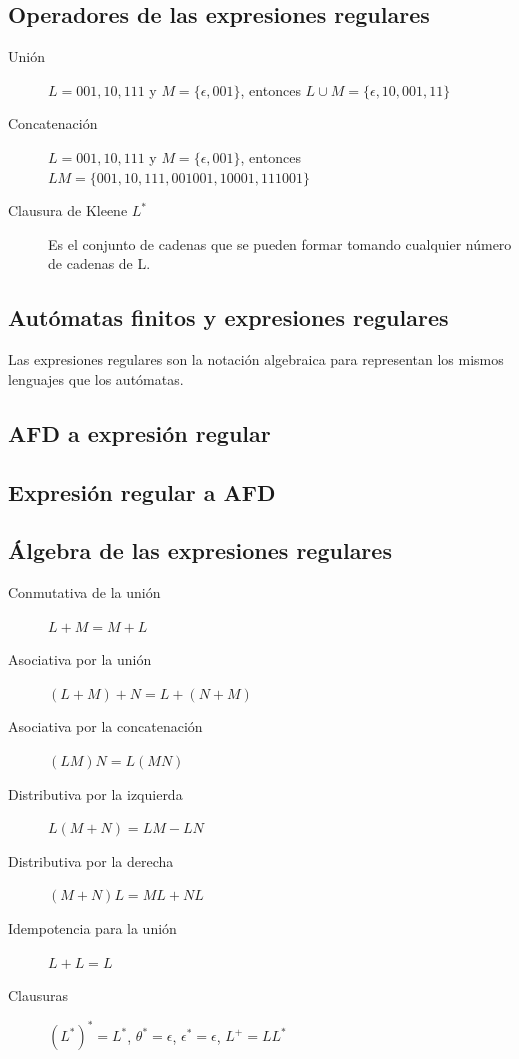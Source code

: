 \documentclass[a4paper,9pt]{extarticle}
\begin{document}
\begin{multicols*}{2}
\subsection{Operadores de las expresiones regulares}
\begin{description}
\item[Unión] $L = {001, 10, 111}$ y $M = \{\epsilon, 001\}$, entonces $L  \cup M=\{\epsilon, 10, 001, 11\}$
\item[Concatenación] $L = {001, 10, 111}$ y $M = \{\epsilon, 001\}$, entonces $LM=\{001, 10, 111, 001001, 10001, 111001 \}$
\item[Clausura de Kleene $L^*$] Es el conjunto de cadenas que se pueden formar tomando cualquier número de cadenas de L.
\end{description}

\subsection{Autómatas finitos y expresiones regulares}
Las expresiones regulares son la notación algebraica  para representan los mismos lenguajes que los autómatas.

\subsection{AFD a expresión regular}

\subsection{Expresión regular a AFD}

\subsection{Álgebra de las expresiones regulares}
\begin{description}
\item[Conmutativa de la unión] $L+M=M+L$
\item[Asociativa por la unión] $(L+M)+N = L + (N +M)$
\item[Asociativa por la concatenación] $(LM)N = L(MN)$
\item[Distributiva por la izquierda] $L(M +N) = LM - LN$
\item[Distributiva por la derecha] $(M + N)L = ML + NL$
\item[Idempotencia para la unión] $L+L = L$
\item[Clausuras] $(L^*)^* = L^* $, $ \theta ^* = \epsilon$, $\epsilon^*=\epsilon$, $L^+=LL^*$
\end{description}



\end{multicols*}
\end{document}
